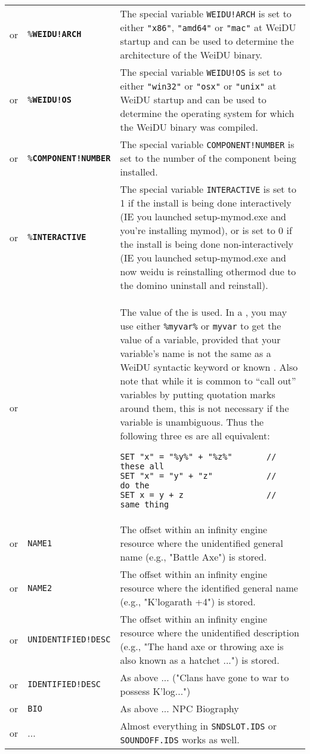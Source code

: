 \documentclass{article}
\def\ttref#1{\ahrefloc{#1}{\tt #1}}
\def\DEFINE#1{{\tt \bf #1}\label{#1}\index{#1}}
\def\t#1{{\tt #1}}
\begin{document}
\begin{tabular}{cp{10in}|p{10in}}
or & \t{\%}\DEFINE{WEIDU!ARCH}\t{\%} & The special variable \t{WEIDU!ARCH}
is set to either \t{"x86"}, \t{"amd64"} or \t{"mac"} at WeiDU startup and can be used to
determine the architecture of the WeiDU binary. \\

or & \t{\%}\DEFINE{WEIDU!OS}\t{\%} & The special variable \t{WEIDU!OS} is set to either
\t{"win32"} or \t{"osx"} or \t{"unix"} at WeiDU startup and can be used to
determine the operating system for which the WeiDU binary was compiled. \\

or & \t{\%}\DEFINE{COMPONENT!NUMBER}\t{\%} & The special variable \t{COMPONENT!NUMBER}
is set to the number of the component being installed. \\

or & \t{\%}\DEFINE{INTERACTIVE}\t{\%} & The special variable \t{INTERACTIVE}
is set to 1 if the install is being done interactively (IE you launched setup-mymod.exe and you're
installing mymod), or is set to 0 if the install is being done non-interactively (IE you launched
setup-mymod.exe and now weidu is reinstalling othermod due to the domino uninstall and reinstall). \\

or & \ttref{variable} &
    The value of the \ttref{variable} is used.
  In a \ttref{patch} \ttref{value}, you may use either \t{\%myvar\%} or
  \t{myvar} to get the value of a variable, provided that your variable's
  name is not the same as a WeiDU syntactic keyword or known
  \ttref{constant}. Also note that while it is common to ``call out''
  variables by putting quotation marks around them, this is not necessary
  if the variable is unambiguous. Thus the following three \ttref{patch}es
  are all equivalent:
\begin{verbatim}
SET "x" = "%y%" + "%z%"       // these all
SET "x" = "y" + "z"           //    do the
SET x = y + z                 //  same thing
\end{verbatim} \\

or & \t{NAME1}   & The offset within an infinity engine resource where the unidentified general name (e.g., "Battle Axe") is stored. \\
or & \t{NAME2}   & The offset within an infinity engine resource where the identified general name (e.g., "K'logarath +4") is stored. \\
or & \t{UNIDENTIFIED!DESC}  & The offset within an infinity engine resource where the unidentified description (e.g., "The hand axe or throwing axe is also known as a hatchet ...") is stored. \\
or & \t{IDENTIFIED!DESC}    & As above ... ("Clans have gone to war to possess K'log...")\\
or & \t{BIO}                & As above ... NPC Biography\\
or & ...        & Almost everything in \t{SNDSLOT.IDS} or \t{SOUNDOFF.IDS}
works as well. \\


\end{tabular}
\end{document}
